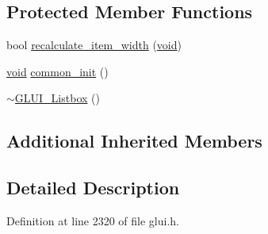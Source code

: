 \subsection*{Protected Member Functions}
\begin{DoxyCompactItemize}
\item 
bool \hyperlink{class_g_l_u_i___listbox_a2d7f6743dea0483354ba495eedfd7d5e}{recalculate\+\_\+item\+\_\+width} (\hyperlink{wglext_8h_a9e6b7f1933461ef318bb000d6bd13b83}{void})
\item 
\hyperlink{wglext_8h_a9e6b7f1933461ef318bb000d6bd13b83}{void} \hyperlink{class_g_l_u_i___listbox_aab5847ab5aa4011667334e9dfb6a5c67}{common\+\_\+init} ()
\item 
\hyperlink{class_g_l_u_i___listbox_ac6eb536028f3c802c0cd9adc647ac0fc}{$\sim$\+G\+L\+U\+I\+\_\+\+Listbox} ()
\end{DoxyCompactItemize}
\subsection*{Additional Inherited Members}


\subsection{Detailed Description}


Definition at line 2320 of file glui.\+h.



